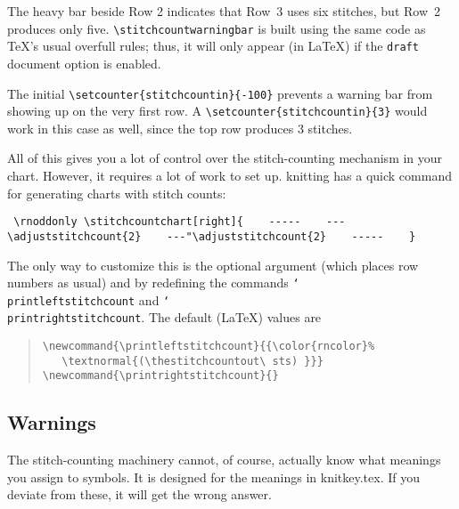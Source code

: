 \documentclass[draft]{amsart}
\begin{document}
\bigskip

The heavy bar beside Row 2 indicates that Row~3 uses six stitches, but Row~2 produces only five. \verb|\stitchcountwarningbar| is built using the same code as \TeX's usual overfull rules; thus, it will only appear (in \LaTeX) if the \texttt{draft} document option is enabled.

The initial \verb?\setcounter{stitchcountin}{-100}? prevents a warning bar from showing up on the very first row. A \verb?\setcounter{stitchcountin}{3}? would work in this case as well, since the top row produces 3 stitches.

All of this gives you a lot of control over the stitch-counting mechanism in your chart. However, it requires a lot of work to set up. \textsf{knitting} has a quick command for generating charts with stitch counts:

\bigskip

\noindent\begin{minipage}[b]{350pt}
\obeylines\parindent=0pt\tt 
\verb?\rnoddonly?
\verb?\stitchcountchart[right]{?
\verb?   -----?
\verb?   ---\adjuststitchcount{2}?
\verb?   ---"\adjuststitchcount{2}?
\verb?   -----?
\verb?   }?
\end{minipage}
\hskip -108pt
\begin{minipage}[b]{108pt}
\rnoddonly
{}
\par\strut
\end{minipage}
\bigskip

The only way to customize this is the optional argument (which places row numbers as usual) and by redefining the commands \texttt{\char`\\ printleftstitchcount} and \texttt{\char`\\ printrightstitchcount}. The default (\LaTeX) values are
\begin{quote}
\verb?\newcommand{\printleftstitchcount}{{\color{rncolor}%?\\
\verb?   \textnormal{(\thestitchcountout\ sts) }}}?\\
\verb?\newcommand{\printrightstitchcount}{}?
\end{quote}

\subsection*{Warnings} The stitch-counting machinery cannot, of course, actually know what meanings you assign to symbols. It is designed for the meanings in \textsf{knitkey.tex}. If you deviate from these, it will get the wrong answer.
\end{document}
